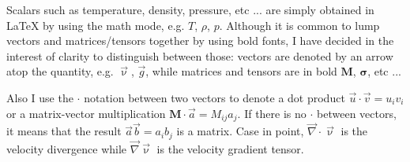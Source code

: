 Scalars such as temperature, density, pressure, etc ... are simply 
obtained in \LaTeX{} by using the math mode, e.g. $T$, $\rho$, $p$.
Although it is common to lump vectors and matrices/tensors together
by using bold fonts, I have decided in the interest of clarity to 
distinguish between those: vectors are denoted by an arrow 
atop the quantity, e.g. $\vec \upnu$, $\vec g$, while matrices 
and tensors are in bold $\bm M$, $\bm \sigma$, etc ...

Also I use the $\cdot$ notation between two vectors to denote a 
dot product $\vec u \cdot \vec v = u_iv_i$ or a matrix-vector
multiplication ${\bm M}\cdot \vec a = M_{ij}a_j$. If there is no
$\cdot$ between vectors, it means that the result 
$\vec a \vec b = a_ib_j$ is a matrix.
Case in point, $\vec\nabla\cdot\vec\upnu$ is the velocity divergence
while $\vec\nabla\vec\upnu$ is the velocity gradient tensor.
